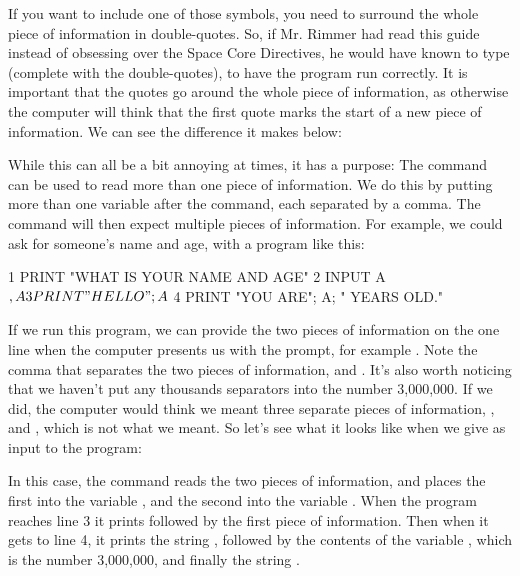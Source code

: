 \needspace{4cm}
If you want to include one of those symbols, you need to surround the
whole piece of information in double-quotes.  So, if Mr. Rimmer had
read this guide instead of obsessing over the Space Core Directives,
he would have known to type  (complete with the
double-quotes), to have the program
  run correctly.  It is important that the quotes go around the whole
  piece of information, as otherwise the computer will think that the
  first quote marks the start of a new piece of information.  We can
  see the difference it makes below:


\needspace{1.5cm}
While this can all be a bit annoying at times, it has a purpose: The
 command can be used to read more than one piece of
information.  We do this by putting more than one variable after the
 command, each separated by a comma.  The 
command will then expect multiple pieces of information.  For example,
we could ask for someone's name and age, with a program like this:

\begin{screenoutput}
  1 PRINT "WHAT IS YOUR NAME AND AGE"
  2 INPUT A$, A
  3 PRINT "HELLO "; A$
  4 PRINT "YOU ARE"; A; " YEARS OLD."
\end{screenoutput}

\needspace{4cm}
If we run this program, we can provide the two pieces of information
on the one line when the computer presents us with the  prompt,
for example . Note the comma that separates the
two pieces of information,  and .  It's also
worth noticing that we haven't put any thousands separators into the
number 3,000,000.  If we did, the computer would think we meant three
separate pieces of information, ,  and ,
which is not what we meant.  So let's see what it looks like when we
give  as input to the program:


  In this case, the 
   command reads the two pieces of
information, and places the first into the variable , and the second
into the variable . When the program reaches line 3 it prints
 followed by the first piece of information.
Then when it gets to line 4, it prints the string ,
followed by the contents of the variable , which is the number
3,000,000, and finally the string .

